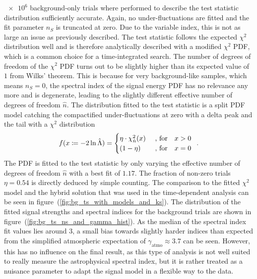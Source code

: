 $\num{e6}$ background-only trials where performed to describe the test statistic distribution sufficiently accurate.
Again, no under-fluctuations are fitted and the fit parameter $n_S$ is truncated at zero.
Due to the variable index, this is not as large an issue as previously described.
The test statistic follows the expected $\chi^2$ distribution well and is therefore analytically described with a modified $\chi^2$ PDF, which is a common choice for a time-integrated search.
The number of degrees of freedom of the $\chi^2$ PDF turns out to be slightly higher than its expected value of $\num{1}$ from Wilks' theorem.
This is because for very background-like samples, which means $n_S=0$, the spectral index of the signal energy PDF has no relevance any more and is degenerate, leading to the slightly different effective number of degrees of freedom $\hat{n}$.
The distribution fitted to the test statistic is a split PDF model catching the compactified under-fluctuations at zero with a delta peak and the tail with a $\chi^2$ distribution
\begin{equation}
  \label{equ:delta_chi2_pdf}
  f(x \coloneqq -2\ln\hat{\Lambda}) =
  \begin{cases}
    \eta \cdot \chi^2_{\hat{n}}(x) &\text{ , for}\quad x > 0 \\
    (1 - \eta) &\text{ , for}\quad x = 0
  \end{cases}
  \enspace\text{.}
\end{equation}
The PDF is fitted to the test statistic by only varying the effective number of degrees of freedom $\hat{n}$ with a best fit of $\num{1.17}$.
The fraction of non-zero trials $\eta=\num{0.54}$ is directly deduced by simple counting.
The comparison to the fitted $\chi^2$ model and the hybrid solution that was used in the time-dependent analysis can be seen in figure~(\ref{fig:bg_ts_with_models_and_ks}).
The distribution of the fitted signal strengths and spectral indices for the background trials are shown in figure~(\ref{fig:bg_ts_ns_and_gamma_hist}).
As the median of the spectral index fit values lies around $\num{3}$, a small bias towards slightly harder indices than expected from the simplified atmospheric expectation of $\gamma_\text{atmo} \approx 3.7$ can be seen.
However, this has no influence on the final result, as this type of analysis is not well suited to really measure the astrophysical spectral index, but it is rather treated as a nuisance parameter to adapt the signal model in a flexible way to the data.

